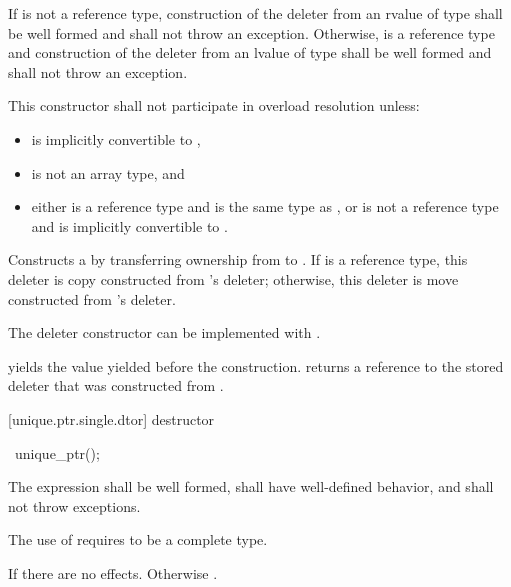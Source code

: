 \begin{itemdescr}
\pnum
\requires If  is not a reference type,
construction of the deleter from an rvalue of type
 shall be well formed and shall not throw an exception.
Otherwise,  is a reference type and construction of the deleter from an
lvalue of type  shall be well formed and shall not throw an exception.

\pnum
\remarks This constructor shall not participate in overload resolution unless:

\begin{itemize}
\item {} is implicitly convertible to ,
\item {} is not an array type, and
\item either  is a reference type and  is the same type as , or
 is not a reference type and  is implicitly convertible to .
\end{itemize}

\pnum
\effects Constructs a  by transferring ownership from 
to . If  is a reference type, this deleter is copy constructed from
's deleter; otherwise, this deleter is move constructed from 's
deleter. \begin{note} The deleter constructor can be implemented with
. \end{note}

\pnum
\postconditions {} yields the value 
yielded before the construction.
 returns a reference
to the stored deleter that was constructed from
.
\end{itemdescr}

[unique.ptr.single.dtor]{ destructor}

%
\begin{itemdecl}
~unique_ptr();
\end{itemdecl}

\begin{itemdescr}
\pnum
\requires The expression  shall be well formed,
shall have well-defined behavior, and shall not throw exceptions. \begin{note} The
use of  requires  to be a complete type.
\end{note}

\pnum
\effects If  there are no effects.
Otherwise .
\end{itemdescr}

